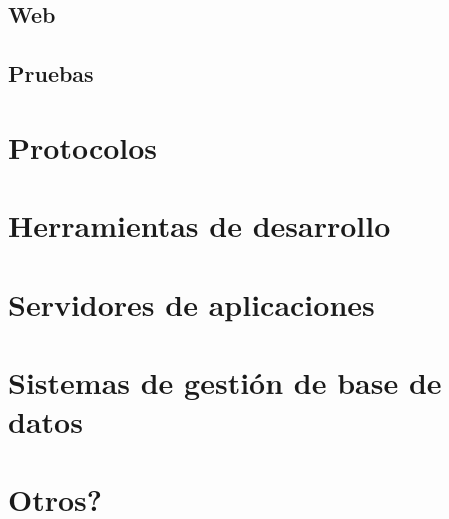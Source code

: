 \subsection{Web}
\subsection{Pruebas}

\section{Protocolos}
\label{sec:protocolos}

\section{Herramientas de desarrollo}
\label{sec:ferramentas}

\section{Servidores de aplicaciones}
\label{sec:servidores}

\section{Sistemas de gestión de base de datos}
\label{sec:bbdd}

\section{Otros?}
\label{sec:otros}